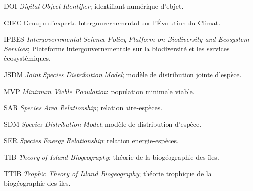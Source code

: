\listeabrev
\begin{liste}

\item[DOI] \> \textit{Digital Object Identifier}; identifiant numérique d'objet.

\item[GIEC]  Groupe d'experts Intergouvernemental sur l'Évolution du Climat.

\item[IPBES] \textit{Intergovernmental Science-Policy Platform on Biodiversity and Ecosystem Services}; Plateforme intergouvernementale sur la biodiversité et les services écosystémiques.

\item[JSDM] \textit{Joint Species Distribution Model}; modèle de distribution jointe d'espèce.

\item[MVP] \textit{Minimum Viable Population}; population minimale viable.

\item[SAR] \textit{Species Area Relationship}; relation aire-espèces.

\item[SDM] \textit{Species Distribution Model}; modèle de distribution d'espèce.

\item[SER] \textit{Species Energy Relationship}; relation energie-espèces.

\item[TIB] \textit{Theory of Island Biogeography}; théorie de la biogéographie des îles.

\item[TTIB] \textit{Trophic Theory of Island Biogeography}; théorie trophique de la biogéographie des îles.

\end{liste}




%
%



